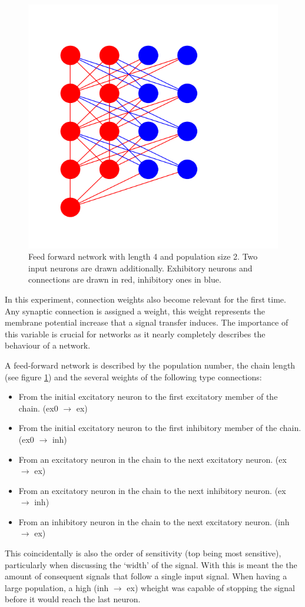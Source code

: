 \documentclass[a4paper,twocolumn]{article}
\begin{document}
\begin{figure}[ht]
    \centering
    \includegraphics[width=.5\textwidth]{figures/feedforward network.png}
    \caption{Feed forward network with length 4 and population size 2. Two input
        neurons are drawn additionally. Exhibitory neurons and connections are drawn
        in red, inhibitory ones in blue.}
    \label{fig:feed-forward}
\end{figure}

In this experiment, connection weights also become relevant for the first time.
Any synaptic connection is assigned a weight, this weight represents the
membrane potential increase that a signal transfer induces. The importance of
this variable is crucial for networks as it nearly completely describes the
behaviour of a network.

A feed-forward network is described by the population number, the chain length
(see figure \ref{fig:feed-forward}) and the several weights of the following
type connections:
\begin{itemize}
    \item From the initial excitatory neuron to the first excitatory member of the
        chain. (ex0 $\rightarrow$ ex)
    \item From the initial excitatory neuron to the first inhibitory member of the
        chain. (ex0 $\rightarrow$ inh)
    \item From an excitatory neuron in the chain to the next excitatory neuron.
        (ex $\rightarrow$ ex)
    \item From an excitatory neuron in the chain to the next inhibitory neuron.
        (ex $\rightarrow$ inh)
    \item From an inhibitory neuron in the chain to the next excitatory neuron.
        (inh $\rightarrow$ ex)
\end{itemize}
This coincidentally is also the order of sensitivity (top being most sensitive),
particularly when discussing the `width' of the signal. With this is meant the
the amount of consequent signals that follow a single input signal. When having
a large population, a high (inh $\rightarrow$ ex) wheight was capable of
stopping the signal before it would reach the last neuron.
\end{document}
